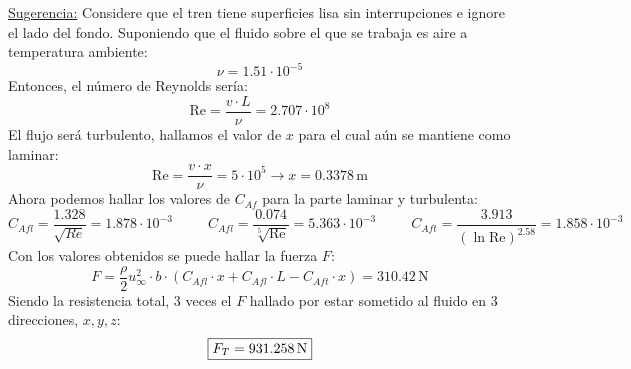 \documentclass[a4paper,12pt]{exam}
\begin{document}
\begin{questions}
\underline{Sugerencia:} Considere que el tren tiene superficies lisa sin interrupciones e ignore el lado 
del fondo.
Suponiendo que el fluido sobre el que se trabaja es aire a temperatura ambiente:
$$
\nu = 1.51\cdot 10^{-5}
$$
Entonces, el número de Reynolds sería:
$$
\mathrm{Re} = \frac{v\cdot L}{\nu} = 2.707\cdot 10^{8}
$$
El flujo será turbulento, hallamos el valor de $x$ para el cual aún se mantiene como laminar:
$$
\mathrm{Re} = \frac{v\cdot x}{\nu} = 5\cdot 10^{5} \longrightarrow x = 0.3378\,\mathrm{m}
$$
Ahora podemos hallar los valores de $C_{Af}$ para la parte laminar y turbulenta:
$$
C_{Afl} = \frac{1.328}{\sqrt{Re}} = 1.878\cdot 10^{-3} \hspace{30pt} C_{Afl} = \frac{0.074}{\sqrt[5]{\mathrm{Re}}} = 5.363\cdot 10^{-3} \hspace{30pt} C_{Aft} = \frac{3.913}{(\ln\mathrm{Re})^{2.58}} = 1.858\cdot 10^{-3}
$$
Con los valores obtenidos se puede hallar la fuerza $F$:
$$
F = \frac{\rho}{2} u_{\infty}^{2} \cdot b\cdot (C_{Afl}\cdot x + C_{Afl}\cdot L - C_{Aft}\cdot x) = 310.42\,\mathrm{N}
$$
Siendo la resistencia total, 3 veces el $F$ hallado por estar sometido al fluido en 3 direcciones, $x,y,z$:
$$
\fbox{$F_{T} = 931.258\,\mathrm{N}$}
$$
\end{questions}
\end{document}
